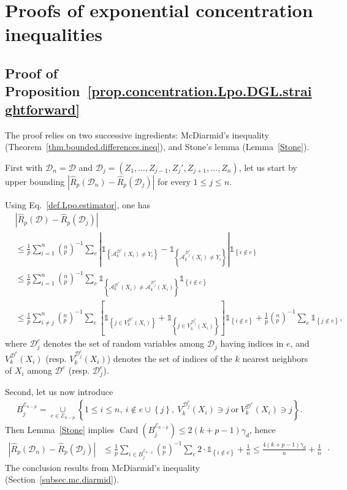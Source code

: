\documentclass[twoside,11pt]{article}
\numberwithin{equation}{section}
\newcommand{\gp}[1]{\left(#1\right)}
\newcommand{\ga}[1]{\left\{#1\right\}}
\newcommand{\gc}[1]{\left[#1\right]}
\newcommand{\1}{\mathds{1}}%
\newcommand{\ind}[1]{\1_{\ga{#1}}}%
\newcommand{\paren}[1]{\left( #1 \right)}
\newcommand{\acc}[1]{\left\{ #1 \right\}}
\newcommand{\abs}[1]{\left\lvert #1 \right\rvert} %
\DeclareMathOperator{\card}{Card} %
\newcommand{\Rh}{\widehat{R}}
\newcommand{\Rhp}{\Rh_p}
\newcommand{\D}{\mathcal{D}}
\newcommand{\Dn}{\mathcal{D}_n}
\newcommand{\A}{\mathcal{A}}
\newcommand{\Enp}{\mathcal{E}_{n-p}}
\numberwithin{equation}{section}
\theoremstyle{plain}
\begin{document}



\newpage


\section{Proofs of exponential concentration inequalities}




\subsection{Proof of Proposition~\ref{prop.concentration.Lpo.DGL.straightforward}}
\label{subsec.bounded.differences.proof}
%
The proof relies on two successive ingredients: McDiarmid's inequality (Theorem~\ref{thm.bounded.differences.ineq}), and Stone's lemma (Lemma~\ref{Stone}).

%
First with $\Dn=\D$ and $\D_j = (Z_1,\ldots,Z_{j-1},Z_j',Z_{j+1},\ldots,Z_n)$, let us start by upper bounding $ \abs{  \Rhp\paren{\Dn} -  \Rhp\paren{\D_j}  } $ for every $1\leq j\leq n$.

Using Eq.~\eqref{def.Lpo.estimator}, one has
\begin{align*}
& \abs{  \Rhp\paren{\D} - \Rhp\paren{\D_j}   } \\
%
 &\leq \frac{1}{p}\sum_{i=1}^n\gp{^n_p}^{-1} \sum_e \abs{\ind{ \A_k^{\D^e}\paren{X_i} \neq Y_i} - \ind{ \A_k^{\D_j^e}\paren{X_i}\neq Y_i} } \ind{i\not\in e}\\
%
 &\leq  \frac{1}{p}\sum_{i=1}^n\gp{^n_p}^{-1} \sum_e \ind{ \A_k^{\D^e}\paren{X_i} \neq \A_k^{\D_j^e}\paren{X_i} }\ind{i\not\in e} \\
%
 &\leq \frac{1}{p}\sum_{i\neq j}^n\gp{^n_p}^{-1} \sum_e \gc{\ind{j \in V_k^{\D^e}(X_i)} + \ind{j \in V_k^{\D_j^e}(X_i)}}\ind{i\not\in e} + \frac{1}{p}\gp{^n_p}^{-1} \sum_e \ind{j\not\in e} ,
\end{align*}
where $\D_j^e$ denotes the set of random variables among $\D_j$ having indices in $e$, and $V_k^{\D^e}(X_i)$ (resp. $V_k^{\D_j^e}(X_i)$) denotes the set of indices of the $k$ nearest neighbors of $X_i$ among $\D^e$ (resp. $\D_j^e$).

Second, let us now introduce
\begin{align*}
B_j^{\Enp} = \underset{e\in \Enp}{\cup} \acc{ 1\leq i\leq n,\ i\not\in e\cup\acc{j},\  V_k^{\D_j^e}(X_i)\ni j\ \mbox{or}\ V_k^{\D^e}(X_i)\ni j}.
\end{align*}
%
Then Lemma~\ref{Stone} implies $\card(B_j^{\Enp}) \leq 2(k+p-1)\gamma_d$, hence
\begin{align*}
\abs{  \Rhp\paren{\Dn} - \Rhp\paren{\D_j}   }  &\leq \frac{1}{p}\sum_{i\in B_j^{\Enp} }\gp{^n_p}^{-1} \sum_e 2\cdot \ind{i\not\in e} + \frac{1}{n}  \leq  \frac{4(k+p-1)\gamma_d}{n} + \frac{1}{n} \enspace\cdot
\end{align*}
%
The conclusion results from McDiarmid's inequality (Section~\ref{subsec.mc.diarmid}).
%
\end{document}
